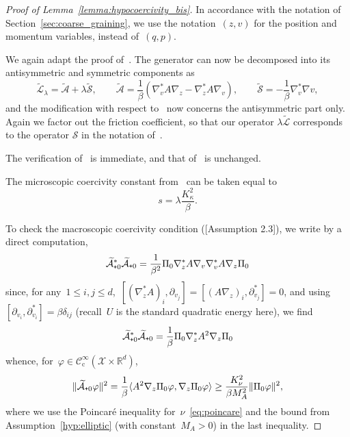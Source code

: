 \documentclass[10pt]{article}
\newcommand{\cL}{\mathcal{L}}
\newcommand{\R}{\mathbb{R}}
\newcommand{\cX}{\mathcal{X}}
\newcommand{\cA}{\mathcal{A}}
\newcommand{\cS}{\mathcal{S}}
\newcommand{\subplus}{\textnormal{\texttt{+}}}
\newcommand{\1}{\mathbbm 1}
\newcommand{\testfuncs}{\mathcal C^\infty_{\mathrm c}}
\begin{document}
\begin{proof}[Proof of Lemma~\ref{lemma:hypocoercivity_bis}]
    In accordance with the notation of Section~\ref{sec:coarse_graining}, we use the notation~$(z,v)$ for the position and momentum variables, instead of~$(q,p)$.

    We again adapt the proof of~\cite[Theorem 3.3]{BFLS22}. The generator can now be decomposed into its antisymmetric and symmetric components as
    \begin{equation}
        \widetilde{\cL}_\lambda = \widetilde{\cA} + \lambda \widetilde{\cS},\qquad \widetilde{\cA} = \frac1\beta\left(\nabla_v^*A\nabla_z - \nabla_z^*A\nabla_v\right),\qquad \widetilde{\cS} = -\frac1\beta \nabla_v^*\nabla v,
    \end{equation}
    and the modification with respect to~\cite{BFLS22} now concerns the antisymmetric part only. Again we factor out the friction coefficient, so that our operator $\lambda\widetilde{\cL}$ corresponds to the operator $\cS$ in the notation of~\cite{BFLS22}.
    
    The verification of~\cite[Assumption 2.1]{BFLS22} is immediate, and that of~\cite[Assumption 2.2]{BFLS22} is unchanged.
    
    The microscopic coercivity constant from~\cite[Assumption 2.2]{BFLS22} can be taken equal to
    \begin{equation}
        \label{eq:micro_coercivity_constant}
        s = \lambda\frac{K_\kappa^2}{\beta}.
    \end{equation}

    To check the macroscopic coercivity condition (\cite{BFLS22}[Assumption 2.3]), we write by a direct computation,
    \begin{equation}
        \widetilde{\cA}^*_{\subplus 0}\widetilde{\cA}_{\subplus 0} = \frac1{\beta^2}\Pi_0\nabla_z^* A\nabla_v\nabla_v^*A\nabla_z\Pi_0
    \end{equation}
    since, for any~$1\leq i,j\leq d$,~$[\left(\nabla_z^* A\right)_i,\partial_{v_j}]=[\left(A\nabla_z\right)_i,\partial_{v_j}^*]=0$, and using~$[\partial_{v_i},\partial_{v_i}^*] = \beta \delta_{ij}$ (recall~$U$ is the standard quadratic energy here), we find
    \begin{equation}
        \label{eq:hyp_2.3_bis}
        \widetilde{\cA}^*_{\subplus 0}\widetilde{\cA}_{\subplus 0} = \frac1\beta\Pi_0\nabla_z^* A^2 \nabla_z\Pi_0
    \end{equation}
    whence, for~$\varphi\in\testfuncs(\cX\times\R^d)$,
    \begin{equation}
        \|\widetilde{\cA}_{\subplus 0}\varphi\|^2 = \frac1\beta\langle A^2\nabla_z\Pi_0\varphi,\nabla_z\Pi_0\varphi\rangle \geq \frac{K_\nu^2}{\beta M_A^2}\|\Pi_0\varphi\|^2,
    \end{equation}
    where we use the Poincar\'e inequality for~$\nu$~\eqref{eq:poincare} and the bound from Assumption~\ref{hyp:elliptic} (with constant~$M_A>0$) in the last inequality.


\end{proof}
\end{document}
